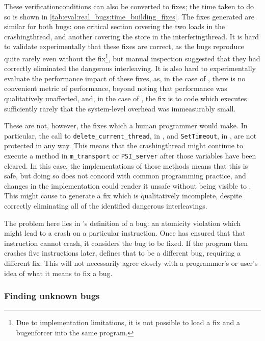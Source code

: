 These \glspl{verificationcondition} can also be converted to fixes;
the time taken to do so is shown in
\autoref{tab:eval:real_bugs:time_building_fixes}.  The fixes generated
are similar for both bugs: one critical section covering the two loads
in the \gls{crashingthread}, and another covering the store in the
\gls{interferingthread}.  It is hard to validate experimentally that
these fixes are correct, as the bugs reproduce quite rarely even
without the fix\footnote{Due to implementation limitations, it is not
  possible to load a {\technique} fix and a {\technique}
  \gls{bugenforcer} into the same program.}, but manual inspection
suggested that they had correctly eliminated the dangerous
interleaving.  It is also hard to experimentally evaluate the
performance impact of these fixes, as, in the case of
, there is no convenient metric of performance,
beyond noting that performance was qualitatively unaffected, and, in
the case of , the fix is to code which executes
sufficiently rarely that the system-level overhead was immeasurably
small.

These are not, however, the fixes which a human programmer would make.
In particular, the call to \texttt{delete\_current\_thread}, in
, and \texttt{SetTimeout}, in ,
are not protected in any way.  This means that the
\gls{crashingthread} might continue to execute a method in
\texttt{m\_transport} or \texttt{PSI\_server} after those variables
have been cleared.  In this case, the implementations of those methods
means that this is safe, but doing so does not concord with common
programming practice, and changes in the implementation could render
it unsafe without being visible to {\technique}.  This might cause
{\technique} to generate a fix which is qualitatively incomplete,
despite correctly eliminating all of the identified dangerous
interleavings.

The problem here lies in {\technique}'s definition of a bug: an
atomicity violation which might lead to a crash on a particular
instruction.  Once {\technique} has ensured that that instruction
cannot crash, it considers the bug to be fixed.  If the program then
crashes five instructions later, {\technique} defines that to be a
different bug, requiring a different fix.  This will not necessarily
agree closely with a programmer's or user's idea of what it means to
fix a bug.

\subsubsection{Finding unknown bugs}

